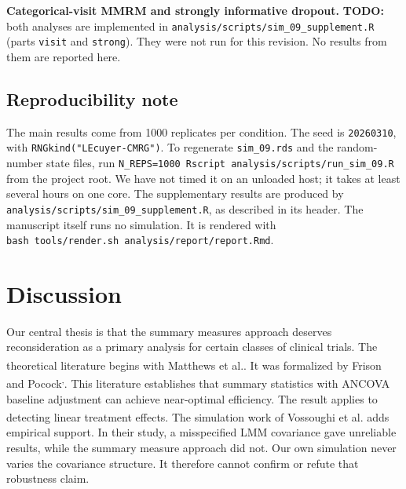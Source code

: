 \documentclass[
  11pt,
]{article}
\begin{document}
\textbf{Categorical-visit MMRM and strongly informative dropout.}
\textbf{TODO:} both analyses are implemented in
\texttt{analysis/scripts/sim\_09\_supplement.R} (parts
\texttt{visit} and \texttt{strong}). They were not run for
this revision. No results from them are reported here.

\subsection{Reproducibility note}\label{reproducibility-note}

The main results come from 1000 replicates per condition.
The seed is \texttt{20260310}, with \texttt{RNGkind("L\textquotesingle{}Ecuyer-CMRG")}. To
regenerate \texttt{sim\_09.rds} and the random-number state files, run
\texttt{N\_REPS=1000\ Rscript\ analysis/scripts/run\_sim\_09.R} from the
project root. We have not timed it on an unloaded host; it
takes at least several hours on one core. The
supplementary results are produced by
\texttt{analysis/scripts/sim\_09\_supplement.R}, as described in its
header. The manuscript itself runs no simulation. It is
rendered with \texttt{bash\ tools/render.sh\ analysis/report/report.Rmd}.

\section{Discussion}\label{discussion}

Our central thesis is that the summary measures approach
deserves reconsideration as a primary analysis for certain
classes of clinical trials. The theoretical literature begins
with Matthews et al.\textsuperscript{}. It was
formalized by Frison and Pocock\textsuperscript{,}. This literature
establishes that summary statistics with ANCOVA baseline
adjustment can achieve near-optimal efficiency. The result
applies to detecting linear treatment effects. The simulation
work of Vossoughi et al.\textsuperscript{} adds empirical
support. In their study, a misspecified LMM covariance gave
unreliable results, while the summary measure approach did
not. Our own simulation never varies the covariance structure.
It therefore cannot confirm or refute that robustness claim.
\end{document}
